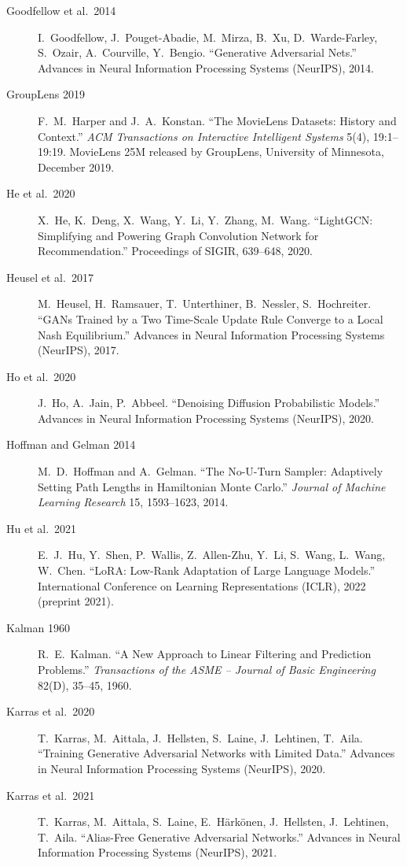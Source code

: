 \documentclass{article}
\begin{document}
\begin{description}
\item[Goodfellow et al.\ 2014] I.\ Goodfellow, J.\ Pouget-Abadie, M.\ Mirza, B.\ Xu, D.\ Warde-Farley, S.\ Ozair, A.\ Courville, Y.\ Bengio. ``Generative Adversarial Nets.'' Advances in Neural Information Processing Systems (NeurIPS), 2014.
\item[GroupLens 2019] F.\ M.\ Harper and J.\ A.\ Konstan. ``The MovieLens Datasets: History and Context.'' \emph{ACM Transactions on Interactive Intelligent Systems} 5(4), 19:1--19:19. MovieLens 25M released by GroupLens, University of Minnesota, December 2019.
\item[He et al.\ 2020] X.\ He, K.\ Deng, X.\ Wang, Y.\ Li, Y.\ Zhang, M.\ Wang. ``LightGCN: Simplifying and Powering Graph Convolution Network for Recommendation.'' Proceedings of SIGIR, 639--648, 2020.
\item[Heusel et al.\ 2017] M.\ Heusel, H.\ Ramsauer, T.\ Unterthiner, B.\ Nessler, S.\ Hochreiter. ``GANs Trained by a Two Time-Scale Update Rule Converge to a Local Nash Equilibrium.'' Advances in Neural Information Processing Systems (NeurIPS), 2017.
\item[Ho et al.\ 2020] J.\ Ho, A.\ Jain, P.\ Abbeel. ``Denoising Diffusion Probabilistic Models.'' Advances in Neural Information Processing Systems (NeurIPS), 2020.
\item[Hoffman and Gelman 2014] M.\ D.\ Hoffman and A.\ Gelman. ``The No-U-Turn Sampler: Adaptively Setting Path Lengths in Hamiltonian Monte Carlo.'' \emph{Journal of Machine Learning Research} 15, 1593--1623, 2014.
\item[Hu et al.\ 2021] E.\ J.\ Hu, Y.\ Shen, P.\ Wallis, Z.\ Allen-Zhu, Y.\ Li, S.\ Wang, L.\ Wang, W.\ Chen. ``LoRA: Low-Rank Adaptation of Large Language Models.'' International Conference on Learning Representations (ICLR), 2022 (preprint 2021).
\item[Kalman 1960] R.\ E.\ Kalman. ``A New Approach to Linear Filtering and Prediction Problems.'' \emph{Transactions of the ASME -- Journal of Basic Engineering} 82(D), 35--45, 1960.
\item[Karras et al.\ 2020] T.\ Karras, M.\ Aittala, J.\ Hellsten, S.\ Laine, J.\ Lehtinen, T.\ Aila. ``Training Generative Adversarial Networks with Limited Data.'' Advances in Neural Information Processing Systems (NeurIPS), 2020.
\item[Karras et al.\ 2021] T.\ Karras, M.\ Aittala, S.\ Laine, E.\ H\"ark\"onen, J.\ Hellsten, J.\ Lehtinen, T.\ Aila. ``Alias-Free Generative Adversarial Networks.'' Advances in Neural Information Processing Systems (NeurIPS), 2021.

\end{description}
\end{document}
